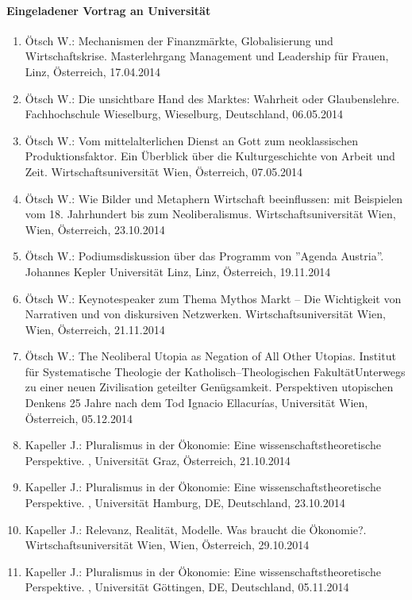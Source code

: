 \paragraph{Eingeladener Vortrag an Universität}
\begin{enumerate}
	\item Ötsch W.: Mechanismen der Finanzmärkte, Globalisierung und Wirtschaftskrise. Masterlehrgang Management und Leadership für Frauen, Linz, Österreich, 17.04.2014
	\item Ötsch W.: Die unsichtbare Hand des Marktes: Wahrheit oder Glaubenslehre. Fachhochschule Wieselburg, Wieselburg, Deutschland, 06.05.2014
	\item Ötsch W.: Vom mittelalterlichen Dienst an Gott zum neoklassischen Produktionsfaktor. Ein Überblick über die Kulturgeschichte von Arbeit und Zeit. Wirtschaftsuniversität Wien, Österreich, 07.05.2014
	\item Ötsch W.: Wie Bilder und Metaphern Wirtschaft beeinflussen: mit Beispielen vom 18. Jahrhundert bis zum Neoliberalismus. Wirtschaftsuniversität Wien, Wien, Österreich, 23.10.2014
	\item Ötsch W.: Podiumsdiskussion über das Programm von ''Agenda Austria''. Johannes Kepler Universität Linz, Linz, Österreich, 19.11.2014
	\item Ötsch W.: Keynotespeaker zum Thema Mythos Markt – Die Wichtigkeit von Narrativen und von diskursiven Netzwerken. Wirtschaftsuniversität Wien, Wien, Österreich, 21.11.2014
	\item Ötsch W.: The Neoliberal Utopia as Negation of All Other Utopias. Institut für Systematische Theologie der Katholisch--Theologischen FakultätUnterwegs zu einer neuen Zivilisation geteilter Genügsamkeit. Perspektiven utopischen Denkens 25 Jahre nach dem Tod Ignacio Ellacurías, Universität Wien, Österreich, 05.12.2014
	\item Kapeller J.: Pluralismus in der Ökonomie: Eine wissenschaftstheoretische Perspektive. , Universität Graz, Österreich, 21.10.2014
	\item Kapeller J.: Pluralismus in der Ökonomie: Eine wissenschaftstheoretische Perspektive. , Universität Hamburg, DE, Deutschland, 23.10.2014
	\item Kapeller J.: Relevanz, Realität, Modelle. Was braucht die Ökonomie?. Wirtschaftsuniversität Wien, Wien, Österreich, 29.10.2014
	\item Kapeller J.: Pluralismus in der Ökonomie: Eine wissenschaftstheoretische Perspektive. , Universität Göttingen, DE, Deutschland, 05.11.2014

\end{enumerate}
